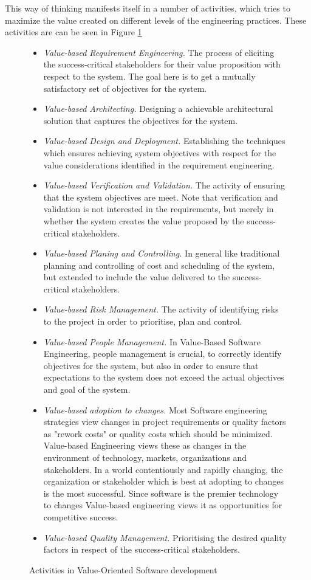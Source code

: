 \documentclass{sig-alternate}
\begin{document}
This way of thinking manifests itself in a number of activities, which tries to maximize the value created on different levels of the engineering practices. These activities are can be seen in Figure \ref{fig:vbseActivities}
\begin{figure}
\caption{Activities in Value-Oriented Software development}
\begin{itemize}
\item \textit{Value-based Requirement Engineering.} The process of eliciting the success-critical stakeholders for their value proposition with respect to the system. The goal here is to get a mutually satisfactory set of objectives for the system.
\item \textit{Value-based Architecting.} Designing a achievable architectural solution that captures the objectives for the system. 
\item \textit{Value-based Design and Deployment.} Establishing the techniques which ensures achieving system objectives with respect for the value considerations identified in the requirement engineering.
\item \textit{Value-based Verification and Validation.} The activity of ensuring that the system objectives are meet. Note that verification and validation is not interested in the requirements, but merely in whether the system creates the value proposed by the success-critical stakeholders.  
\item \textit{Value-based Planing and Controlling.} In general like traditional planning and controlling of cost and scheduling of the system, but extended to include the value delivered to the success-critical stakeholders.
\item \textit{Value-based Risk Management.} The activity of identifying risks to the project in order to prioritise, plan and control.
\item \textit{Value-based People Management.} In Value-Based Software Engineering, people management is crucial, to correctly identify objectives for the system, but also in order to ensure that expectations to the system does not exceed the actual objectives and goal of the system. 
\item \textit{Value-based adoption to changes.} Most Software engineering strategies view changes in  project requirements or quality factors as "rework costs" or quality costs which should be minimized. Value-based Engineering views these as changes in the environment of technology, markets, organizations and stakeholders. In a world contentiously and rapidly changing, the organization or stakeholder which is best at adopting to changes is the most successful. Since software is the premier technology to changes \cite{boehm:valuebased} Value-based engineering views it as opportunities for competitive success.
\item \textit{Value-based Quality Management.} Prioritising the desired quality factors in respect of the success-critical stakeholders.
\end{itemize} 
\label{fig:vbseActivities}
\end{figure}
\end{document}
